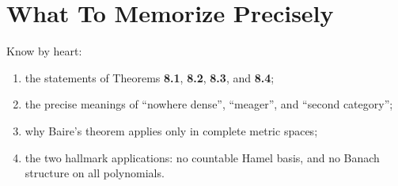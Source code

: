 \documentclass[11pt]{article}
\begin{document}
\section{What To Memorize Precisely}

\begin{focusbox}
Know by heart:
\begin{enumerate}
\item the statements of Theorems \textbf{8.1}, \textbf{8.2}, \textbf{8.3}, and \textbf{8.4};
\item the precise meanings of ``nowhere dense'', ``meager'', and ``second category'';
\item why Baire's theorem applies only in complete metric spaces;
\item the two hallmark applications: no countable Hamel basis, and no Banach structure on all polynomials.
\end{enumerate}
\end{focusbox}
\end{document}
